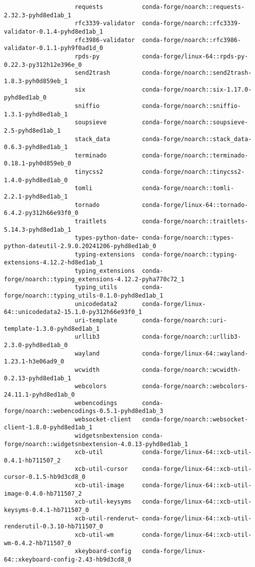 \documentclass{article}
\begin{document}
\begin{enumerate}
\begin{itemize}
\begin{itemize}
\begin{itemize}
\begin{verbatim}
					requests           conda-forge/noarch::requests-2.32.3-pyhd8ed1ab_1 
					rfc3339-validator  conda-forge/noarch::rfc3339-validator-0.1.4-pyhd8ed1ab_1 
					rfc3986-validator  conda-forge/noarch::rfc3986-validator-0.1.1-pyh9f0ad1d_0 
					rpds-py            conda-forge/linux-64::rpds-py-0.22.3-py312h12e396e_0 
					send2trash         conda-forge/noarch::send2trash-1.8.3-pyh0d859eb_1 
					six                conda-forge/noarch::six-1.17.0-pyhd8ed1ab_0 
					sniffio            conda-forge/noarch::sniffio-1.3.1-pyhd8ed1ab_1 
					soupsieve          conda-forge/noarch::soupsieve-2.5-pyhd8ed1ab_1 
					stack_data         conda-forge/noarch::stack_data-0.6.3-pyhd8ed1ab_1 
					terminado          conda-forge/noarch::terminado-0.18.1-pyh0d859eb_0 
					tinycss2           conda-forge/noarch::tinycss2-1.4.0-pyhd8ed1ab_0 
					tomli              conda-forge/noarch::tomli-2.2.1-pyhd8ed1ab_1 
					tornado            conda-forge/linux-64::tornado-6.4.2-py312h66e93f0_0 
					traitlets          conda-forge/noarch::traitlets-5.14.3-pyhd8ed1ab_1 
					types-python-date~ conda-forge/noarch::types-python-dateutil-2.9.0.20241206-pyhd8ed1ab_0 
					typing-extensions  conda-forge/noarch::typing-extensions-4.12.2-hd8ed1ab_1 
					typing_extensions  conda-forge/noarch::typing_extensions-4.12.2-pyha770c72_1 
					typing_utils       conda-forge/noarch::typing_utils-0.1.0-pyhd8ed1ab_1 
					unicodedata2       conda-forge/linux-64::unicodedata2-15.1.0-py312h66e93f0_1 
					uri-template       conda-forge/noarch::uri-template-1.3.0-pyhd8ed1ab_1 
					urllib3            conda-forge/noarch::urllib3-2.3.0-pyhd8ed1ab_0 
					wayland            conda-forge/linux-64::wayland-1.23.1-h3e06ad9_0 
					wcwidth            conda-forge/noarch::wcwidth-0.2.13-pyhd8ed1ab_1 
					webcolors          conda-forge/noarch::webcolors-24.11.1-pyhd8ed1ab_0 
					webencodings       conda-forge/noarch::webencodings-0.5.1-pyhd8ed1ab_3 
					websocket-client   conda-forge/noarch::websocket-client-1.8.0-pyhd8ed1ab_1 
					widgetsnbextension conda-forge/noarch::widgetsnbextension-4.0.13-pyhd8ed1ab_1 
					xcb-util           conda-forge/linux-64::xcb-util-0.4.1-hb711507_2 
					xcb-util-cursor    conda-forge/linux-64::xcb-util-cursor-0.1.5-hb9d3cd8_0 
					xcb-util-image     conda-forge/linux-64::xcb-util-image-0.4.0-hb711507_2 
					xcb-util-keysyms   conda-forge/linux-64::xcb-util-keysyms-0.4.1-hb711507_0 
					xcb-util-renderut~ conda-forge/linux-64::xcb-util-renderutil-0.3.10-hb711507_0 
					xcb-util-wm        conda-forge/linux-64::xcb-util-wm-0.4.2-hb711507_0 
					xkeyboard-config   conda-forge/linux-64::xkeyboard-config-2.43-hb9d3cd8_0 

\end{verbatim}
\end{itemize}
\end{itemize}
\end{itemize}
\end{enumerate}
\end{document}
